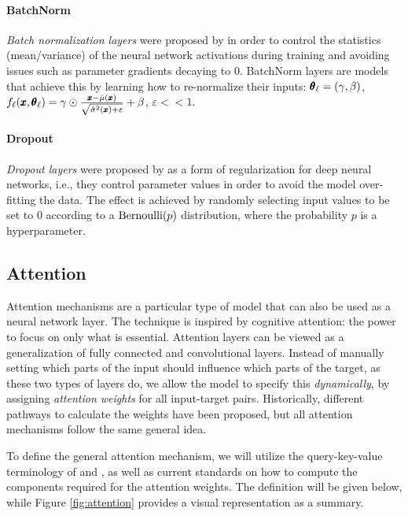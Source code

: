 \paragraph{BatchNorm} \emph{Batch normalization layers} were proposed by \cite{ioffe_batch_2015} in order to control the statistics (mean/variance) of the neural network activations during training and avoiding issues such as parameter gradients decaying to $0$. BatchNorm layers are models that achieve this by learning how to re-normalize their inputs: $\pmb{\theta}_{\ell} = \mathopen{}\left(\gamma, \beta\right)$, $f_{\ell}\mathopen{}\left(\pmb{x}, \pmb{\theta}_{\ell}\right) = \gamma \odot \frac{\pmb{x}-\hat{\mu}\mathopen{}\left(\pmb{x}\right)}{\sqrt{\hat{\sigma}^2\mathopen{}\left(\pmb{x}\right) + \varepsilon}} + \beta$, $\varepsilon << 1$.

\paragraph{Dropout} \emph{Dropout layers} were proposed by \cite{hinton_improving_2012} as a form of regularization for deep neural networks, i.e., they control parameter values in order to avoid the model over-fitting the data. The effect is achieved by randomly selecting input values to be set to $0$ according to a $\text{Bernoulli}\mathopen{}\left(p\right)$ distribution, where the probability $p$ is a hyperparameter.
 
\subsection{Attention}
Attention mechanisms are a particular type of model that can also be used as a neural network layer. The technique is inspired by cognitive attention: the power to focus on only what is essential. Attention layers can be viewed as a generalization of fully connected and convolutional layers. Instead of manually setting which parts of the input should influence which parts of the target, as these two types of layers do, we allow the model to specify this \emph{dynamically}, by assigning \emph{attention weights} for all input-target pairs. Historically, different pathways to calculate the weights have been proposed, but all attention mechanisms follow the same general idea.

To define the general attention mechanism, we will utilize the query-key-value terminology of \cite{graves_neural_2014} and \cite{vaswani_attention_2017}, as well as current standards on how to compute the components required for the attention weights. The definition will be given below, while Figure \ref{fig:attention} provides a visual representation as a summary.

